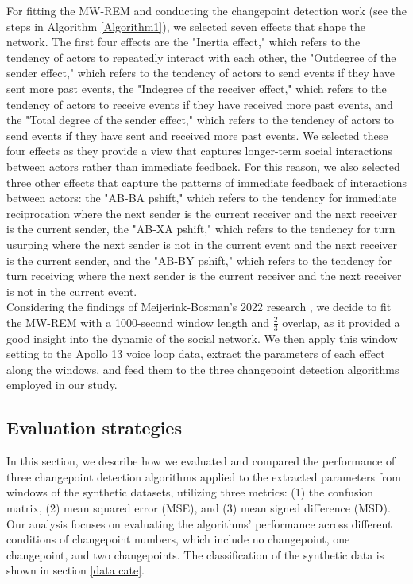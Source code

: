 \documentclass[]{interact}
\theoremstyle{plain}%
\theoremstyle{definition}
\theoremstyle{remark}
\begin{document}
    For fitting the MW-REM and conducting the changepoint detection work (see the steps in Algorithm \autoref{Algorithm1}), we selected seven effects that shape the network. The first four effects are the "Inertia effect," which refers to the tendency of actors to repeatedly interact with each other, the "Outdegree of the sender effect," which refers to the tendency of actors to send events if they have sent more past events, the "Indegree of the receiver effect," which refers to the tendency of actors to receive events if they have received more past events, and the "Total degree of the sender effect," which refers to the tendency of actors to send events if they have sent and received more past events. We selected these four effects as they provide a view that captures longer-term social interactions between actors rather than immediate feedback. For this reason, we also selected three other effects that capture the patterns of immediate feedback of interactions between actors: the "AB-BA pshift," which refers to the tendency for immediate reciprocation where the next sender is the current receiver and the next receiver is the current sender, the "AB-XA pshift," which refers to the tendency for turn usurping where the next sender is not in the current event and the next receiver is the current sender, and the "AB-BY pshift," which refers to the tendency for turn receiving where the next sender is the current receiver and the next receiver is not in the current event. \\
    
    Considering the findings of Meijerink-Bosman's 2022 research \cite{meijerink-bosmanDynamicRelationalEvent2022}, we decide to fit the MW-REM with a 1000-second window length and $\frac{2}{3}$ overlap, as it provided a good insight into the dynamic of the social network. We then apply this window setting to the Apollo 13 voice loop data, extract the parameters of each effect along the windows, and feed them to the three changepoint detection algorithms employed in our study.

	\subsection{Evaluation strategies} \label{sec:evaluation method}
	
	\hspace{0.28cm} In this section, we describe how we evaluated and compared the performance of three changepoint detection algorithms applied to the extracted parameters from windows of the synthetic datasets, utilizing three metrics: (1) the confusion matrix, (2) mean squared error (MSE), and (3) mean signed difference (MSD). Our analysis focuses on evaluating the algorithms' performance across different conditions of changepoint numbers, which include no changepoint, one changepoint, and two changepoints. The classification of the synthetic data is shown in section \ref{data cate}.
	
\end{document}
